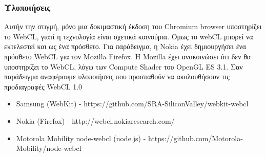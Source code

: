 \subsubsection{Υλοποιήσεις}
Αυτήν την στιγμή, μόνο μια δοκιμαστική έκδοση του Chromium browser υποστηρίζει το WebCL, γιατί η τεχνολογία είναι σχετικά καινούρια. Όμως το webCL μπορεί να εκτελεστεί και ως ένα πρόσθετο. Για παράδειγμα, η Nokia έχει δημιουργήσει ένα πρόσθετο WebCL για τον Mozilla Firefox. Η Mozilla έχει ανακοινώσει ότι δεν θα υποστηρίξει το WebCL, λόγω των Compute Shader του OpenGL ES 3.1. Σαν παράδειγμα αναφέρουμε υλοποιήσεις που προσπαθούν να ακολουθήσουν τις προδιαγραφές WebCL 1.0
\begin{itemize}
\item Samsung (WebKit) - https://github.com/SRA-SiliconValley/webkit-webcl
\item Nokia (Firefox) - http://webcl.nokiaresearch.com/
\item Motorola Mobility node-webcl (node.js) - https://github.com/Motorola-Mobility/node-webcl
\end{itemize}


